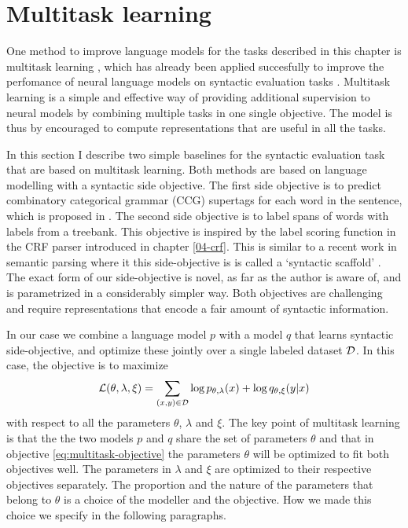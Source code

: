 \section{Multitask learning}
One method to improve language models for the tasks described in this chapter is multitask learning \cite{collobert2008unified,collobert2011natural,zhang2016multitask,goldberg2016multitask}, which has already been applied succesfully to improve the perfomance of neural language models on syntactic evaluation tasks \citep{enguehard2017multitask,linzen2018targeted}. Multitask learning is a simple and effective way of providing additional supervision to neural models by combining multiple tasks in one single objective. The model is thus by encouraged to compute representations that are useful in all the tasks.

In this section I describe two simple baselines for the syntactic evaluation task that are based on multitask learning. Both methods are based on language modelling with a syntactic side objective. The first side objective is to predict combinatory categorical grammar (CCG) supertags \citep{bangalore1999supertagging} for each word in the sentence, which is proposed in \citep{enguehard2017multitask}. The second side objective is to label spans of words with labels from a treebank. This objective is inspired by the label scoring function in the CRF parser introduced in chapter \ref{04-crf}. This is similar to a recent work in semantic parsing where it this side-objective is is called a `syntactic scaffold' \citep{swayamdipta2018scaffold}. The exact form of our side-objective is novel, as far as the author is aware of, and is parametrized in a considerably simpler way. Both objectives are challenging and require representations that encode a fair amount of syntactic information.

In our case we combine a language model $p$ with a model $q$ that learns syntactic side-objective, and optimize these jointly over a single labeled dataset $\mathcal{D}$. In this case, the objective is to maximize
\begin{equation}
  \label{eq:multitask-objective}
  \mathcal{L}(\theta, \lambda, \xi) = \sum_{ (x, y) \in \mathcal{D} }\log p_{\theta, \lambda}(x) + \log q_{\theta,\xi}(y | x)
\end{equation}
with respect to all the parameters $\theta$, $\lambda$ and $\xi$. The key point of multitask learning is that the the two models $p$ and $q$ share the set of parameters $\theta$ and that in objective \ref{eq:multitask-objective} the parameters $\theta$ will be optimized to fit both objectives well. The parameters in $\lambda$ and $\xi$ are optimized to their respective objectives separately. The proportion and the nature of the parameters that belong to $\theta$ is a choice of the modeller and the objective. How we made this choice we specify in the following paragraphs.


